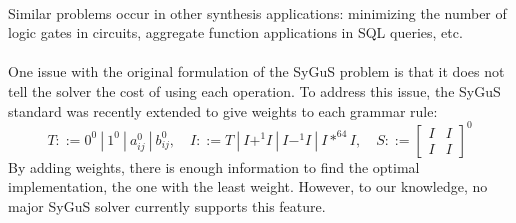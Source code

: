\paragraph{}
Similar problems occur in other synthesis applications: minimizing the number of logic gates in circuits, aggregate function applications in SQL queries, etc.
%
\paragraph{}
One issue with the original formulation of the SyGuS problem is that it does not tell the solver the cost of using each operation. To address this issue, the SyGuS standard was recently extended to give weights to each grammar rule:
%
\[
T ::= 0^0 \ | \ 1^0 \ | \ a_{ij}^0 \ | \ b_{ij}^0, \quad
I ::= T \ | \ I +^1 I \ | \ I -^1 I \ | \ I *^{64} I, \quad
S ::=
\begin{bmatrix} I & I \\
I & I
\end{bmatrix}^0
\]
%
By adding weights, there is enough information to find the optimal implementation, the one with the least weight.
%
However, to our knowledge, no major SyGuS solver currently supports this feature.
